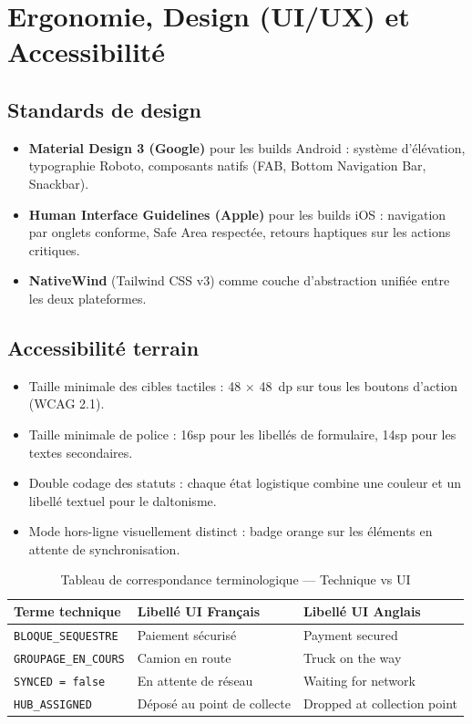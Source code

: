 \documentclass[12pt,a4paper]{report}
\begin{document}
\section{Ergonomie, Design (UI/UX) et Accessibilité}

\subsection{Standards de design}

\begin{itemize}
  \item \textbf{Material Design 3 (Google)} pour les builds Android : système d'élévation, typographie Roboto, composants natifs (FAB, Bottom Navigation Bar, Snackbar).
  \item \textbf{Human Interface Guidelines (Apple)} pour les builds iOS : navigation par onglets conforme, Safe Area respectée, retours haptiques sur les actions critiques.
  \item \textbf{NativeWind} (Tailwind CSS v3) comme couche d'abstraction unifiée entre les deux plateformes.
\end{itemize}

\subsection{Accessibilité terrain}

\begin{itemize}
  \item Taille minimale des cibles tactiles : 48 $\times$ 48~dp sur tous les boutons d'action (WCAG 2.1).
  \item Taille minimale de police : 16sp pour les libellés de formulaire, 14sp pour les textes secondaires.
  \item Double codage des statuts : chaque état logistique combine une couleur et un libellé textuel pour le daltonisme.
  \item Mode hors-ligne visuellement distinct : badge orange sur les éléments en attente de synchronisation.
\end{itemize}

\begin{table}[H]
\centering
\caption{Tableau de correspondance terminologique — Technique vs UI}
\begin{tabularx}{\textwidth}{L{4cm} X X}
\toprule
\textbf{Terme technique} & \textbf{Libellé UI Français} & \textbf{Libellé UI Anglais} \\
\midrule
\texttt{BLOQUE\_SEQUESTRE} & Paiement sécurisé & Payment secured \\
\texttt{GROUPAGE\_EN\_COURS} & Camion en route & Truck on the way \\
\texttt{SYNCED = false} & En attente de réseau & Waiting for network \\
\texttt{HUB\_ASSIGNED} & Déposé au point de collecte & Dropped at collection point \\
\bottomrule
\end{tabularx}
\end{table}
\end{document}
